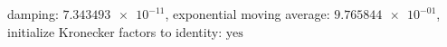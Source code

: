 damping: $\num[scientific-notation=true]{7.343493e-11}$, exponential moving average: $\num[scientific-notation=true]{9.765844e-01}$, initialize Kronecker factors to identity: $\text{yes}$